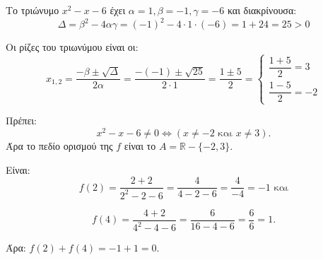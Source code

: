 
\begin{alist}
\item Το τριώνυμο $x^2 - x - 6$ έχει $\alpha = 1, \beta = -1, \gamma = -6$ και διακρίνουσα:
\[\Delta = \beta^2 - 4\alpha\gamma = (-1)^2 - 4 \cdot 1 \cdot (-6) = 1 + 24 = 25 > 0\]

Οι ρίζες του τριωνύμου είναι οι:
\[x_{1,2} = \dfrac{-\beta \pm \sqrt{\Delta}}{2\alpha} = \dfrac{-(-1) \pm \sqrt{25}}{2 \cdot 1} = \dfrac{1 \pm 5}{2} = \begin{cases} \dfrac{1 + 5}{2} = 3 \\ \dfrac{1 - 5}{2} = -2 \end{cases}\]

Πρέπει:
\[x^2 - x - 6 \ne 0 \Leftrightarrow (x \ne -2 \text{ και } x \ne 3).\]
Άρα το πεδίο ορισμού της $f$ είναι το $A = \mathbb{R} - \{-2, 3\}$.

\item Είναι:
\[f(2) = \dfrac{2 + 2}{2^2 - 2 - 6} = \dfrac{4}{4 - 2 - 6} = \dfrac{4}{-4} = -1\text{ και}\]

\[f(4) = \dfrac{4 + 2}{4^2 - 4 - 6} = \dfrac{6}{16 - 4 - 6} = \dfrac{6}{6} = 1.\]

Άρα:
$f(2) + f(4) = -1 + 1 = 0$.
\end{alist}

